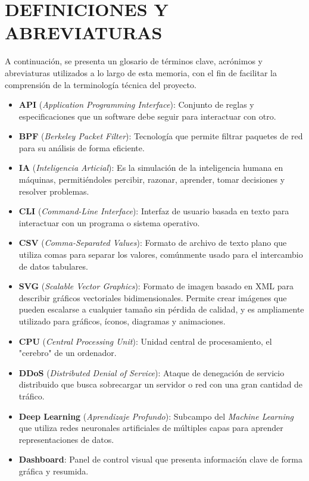 \chapter{DEFINICIONES Y ABREVIATURAS}

A continuación, se presenta un glosario de términos clave, acrónimos y abreviaturas utilizados a lo largo de esta memoria, con el fin de facilitar la comprensión de la terminología técnica del proyecto.

\begin{itemize}
\item \textbf{API} (\textit{Application Programming Interface}): Conjunto de reglas y especificaciones que un software debe seguir para interactuar con otro.
\item \textbf{BPF} (\textit{Berkeley Packet Filter}): Tecnología que permite filtrar paquetes de red para su análisis de forma eficiente.

\item \textbf{IA} (\textit{Inteligencia Articial}): Es la simulación de la inteligencia humana en máquinas, permitiéndoles percibir, razonar, aprender, tomar decisiones y resolver problemas.

\item \textbf{CLI} (\textit{Command-Line Interface}): Interfaz de usuario basada en texto para interactuar con un programa o sistema operativo.
\item \textbf{CSV} (\textit{Comma-Separated Values}): Formato de archivo de texto plano que utiliza comas para separar los valores, comúnmente usado para el intercambio de datos tabulares.

\item \textbf{SVG} (\textit{Scalable Vector Graphics}): Formato de imagen basado en XML para describir gráficos vectoriales bidimensionales. Permite crear imágenes que pueden escalarse a cualquier tamaño sin pérdida de calidad, y es ampliamente utilizado para gráficos, íconos, diagramas y animaciones.

\item \textbf{CPU} (\textit{Central Processing Unit}): Unidad central de procesamiento, el "cerebro" de un ordenador.
\item \textbf{DDoS} (\textit{Distributed Denial of Service}): Ataque de denegación de servicio distribuido que busca sobrecargar un servidor o red con una gran cantidad de tráfico.


\item \textbf{Deep Learning} (\textit{Aprendizaje Profundo}): Subcampo del \textit{Machine Learning} que utiliza redes neuronales artificiales de múltiples capas para aprender representaciones de datos.
\item \textbf{Dashboard}: Panel de control visual que presenta información clave de forma gráfica y resumida.


\end{itemize}
